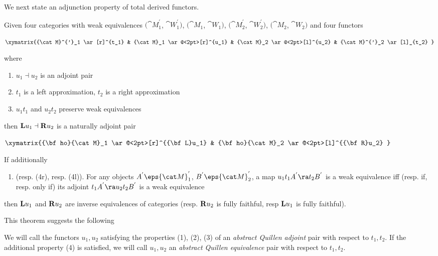 We next state an adjunction property of total derived functors. 
\begin{thm}
\label{thm:generalexistencetotalderivedadjoint}
Given four categories with weak equivalences $({\cat M}^{'}_1$, ${\cat W}^{'}_1)$, $({\cat M}_1$, ${\cat W}_1)$, $({\cat M}^{'}_2$, ${\cat W}^{'}_2)$, $({\cat M}_2$, ${\cat W}_2)$ and four functors
\begin{center}
$\xymatrix {{\cat M}^{'}_1 \ar[r]^{t_1} & {\cat M}_1 \ar@<2pt>[r]^{u_1} & {\cat M}_2 \ar@<2pt>[l]^{u_2} & {\cat M}^{'}_2 \ar[l]_{t_2} }$
\end{center}
where 
\begin{enumerate}
\item
$u_1 \dashv u_2$ is an adjoint pair
\item
$t_1$ is a left approximation, $t_2$ is a right approximation
\item
$u_1t_1$ and $u_2t_2$ preserve weak equivalences
\end{enumerate}
then ${\bf L}u_1 \dashv {\bf R}u_2$ is a naturally adjoint pair 
\begin{center}
$\xymatrix {{\bf ho}{\cat M}_1 \ar@<2pt>[r]^{{\bf L}u_1} & {\bf ho}{\cat M}_2 \ar@<2pt>[l]^{{\bf R}u_2} }$
\end{center}
If additionally
\begin{enumerate}
\item[(4)]
(resp. (4r), resp. (4l)).
For any objects $A^{'} \eps {\cat M}^{'}_1$, $B^{'} \eps {\cat M}^{'}_2$, a map $u_1t_1A^{'} \ra t_2B^{'}$ is a weak equivalence iff (resp. if, resp. only if) its adjoint $t_1A^{'} \ra u_2t_2B^{'}$ is a weak equivalence
\end{enumerate}
then ${\bf L}u_1$ and ${\bf R}u_2$ are inverse equivalences of categories (resp. ${\bf R}u_2$ is fully faithful, resp ${\bf L}u_1$ is fully faithful).
\end{thm}

This theorem suggests the following
\begin{defn}
\label{defn:abstractQuillenadjoint}
We will call the functors $u_1, u_2$ satisfying the properties (1), (2), (3) of  an {\it abstract Quillen adjoint} pair with respect to $t_1, t_2$. If the additional property (4) is satisfied, we will call $u_1, u_2$ an {\it abstract Quillen equivalence} pair with respect to $t_1, t_2$.
\end{defn}

